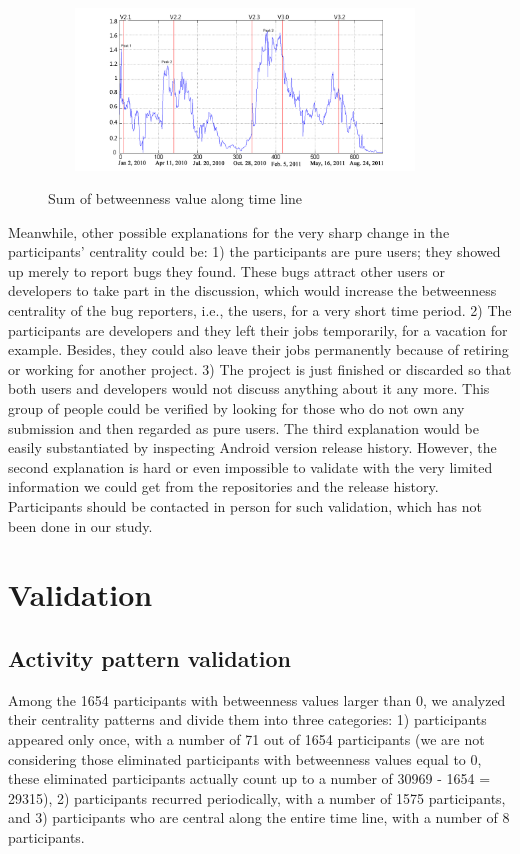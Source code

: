\documentclass[10pt, conference, compsocconf]{IEEEtran}
\begin{document}
\begin{figure}[!t]
\centerline{\includegraphics[width=4.1in, height = 4.3cm]{betweenness.png}
\label{betweenness}}
\caption{Sum of betweenness value along time line}
\end{figure}

Meanwhile, other possible explanations for the very sharp change in the participants' centrality could be: 1) the participants are pure users; they showed up merely to report bugs they found. These bugs attract other users or developers to take part in the discussion, which would increase the betweenness centrality of the bug reporters, i.e., the users, for a very short time period. 2) The participants are developers and they left their jobs temporarily, for a vacation for example. Besides, they could also leave their jobs permanently because of retiring or working for another project. 3) The project is just finished or discarded so that both users and developers would not discuss anything about it any more. This group of people could be verified by looking for those who do not own any submission and then regarded as pure users. The third explanation would be easily substantiated by inspecting Android version release history. However, the second explanation is hard or even impossible to validate with the very limited information we could get from the repositories and the release history. Participants should be contacted in person for such validation, which has not been done in our study.



\section{Validation}
\label{validation}
\subsection{Activity pattern validation}
Among the 1654 participants with betweenness values larger than 0, we analyzed their centrality patterns and divide them into three categories: 
1) participants appeared only once, with a number of 71 out of 1654 participants (we are not considering those eliminated participants with betweenness values equal to 0, these eliminated participants actually count up to a number of 30969 - 1654 = 29315), 
2) participants recurred periodically, with a number of 1575 participants,
and 3) participants who are central along the entire time line, with a number of 8 participants.
\end{document}
